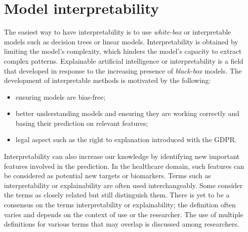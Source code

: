 \documentclass[../main.tex]{subfiles}
\begin{document}
\section{Model interpretability}
	The easiest way to have interpretability is to use \emph{white-box} or interpretable models such as decision trees or linear models.
	Interpretability is obtained by limiting the model's complexity, which hinders the model's capacity to extract complex patterns.
	Explainable artificial intelligence or interpretability is a field that developed in response to the increasing presence of \emph{black-box} models.
	The development of interpretable methods is motivated by the following:
	\begin{itemize}[nosep]
	    \item ensuring models are bias-free;
	    \item better understanding models and ensuring they are working correctly and basing their prediction on relevant features;
	    \item legal aspect such as the right to explanation introduced with the GDPR\@.
	\end{itemize}
	Interpretability can also increase our knowledge by identifying new important features involved in the prediction.
	In the healthcare domain, such features can be considered as potential new targets or biomarkers.
	Terms such as interpretability or explainability are often used interchangeably.
	Some consider the terms as closely related but still distinguish them.
	There is yet to be a consensus on the terms interpretability or explainability; the definition often varies and depends on the context of use or the researcher.
	The use of multiple definitions for various terms that may overlap is discussed among researchers.
\end{document}
